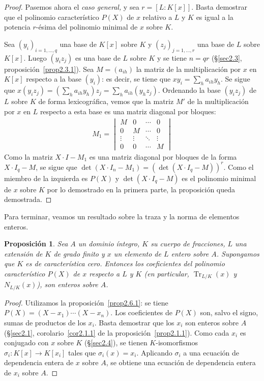 \documentclass[oneside,bibtotoc,leqno,spanish]{amsbook}
\newcommand{\QED}{}%
\renewcommand{\to}[1][]{\xrightarrow{#1}}
\DeclareMathOperator{\Tr}{Tr}
\numberwithin{equation}{section}
\theoremstyle{defi}
\theoremstyle{note}
\newtheorem{proposition}{Proposici\'on}
\theoremstyle{rem}
\numberwithin{theorem}{section}
\numberwithin{proposition}{section}
\numberwithin{definition}{section}
\numberwithin{lemma}{section}
\numberwithin{corollary}{section}
\numberwithin{example}{section}
\numberwithin{footnote}{section}%
\begin{document}
\begin{proof}
Pasemos ahora el {\em caso general,} y sea $r = [L:K[x]]$. Basta demostrar que el polinomio caracter\'istico
$P(X)$ de $x$ relativo a $L$ y $K$ es igual a la potencia $r$-\'esima del polinomio minimal de $x$ sobre $K$.

Sea $(y_{i})_{i=1,\dots,q}$ una base de $K[x]$ sobre $K$ y $(z_{j})_{j=1,\dots,r}$ una base de $L$ sobre $K[x]$.
Luego $(y_{i}z_{j})$ es una base de $L$ sobre $K$ y se tiene $n = qr$ (\S\ref{sec2.3}, proposici\'on~\ref{prop2.3.1}). Sea $M = (a_{ih})$ la
matriz de la multiplicaci\'on por $x$ en $K[x]$ respecto a la base $(y_{i})$: es decir, se tiene que
$xy_{i} = \sum_{h}a_{ih}y_{h}$. Se sigue que $x(y_{i}z_{j}) = \left(\sum_{h}a_{ih}y_{h}\right)z_{j}
= \sum_{h} a_{ih}(y_{h}z_{j})$. Ordenando la base $(y_{i}z_{j})$ de $L$ sobre $K$ de forma lexicogr\'afica,
vemos que la matriz $M'$ de la multiplicaci\'on por $x$ en $L$ respecto a esta base es una matriz
diagonal por bloques:
\begin{gather*}
M_{1} = \begin{vmatrix}
M & 0 & \cdots & 0\\
0 & M & \cdots & 0\\
\vdots & \vdots & \ddots & \vdots\\
0 & 0 & \cdots & M
\end{vmatrix}
\end{gather*}
Como la matriz $X\cdot I-M_{1}$ es una matriz diagonal por bloques de la forma $X\cdot I_{q}-M$, se sigue que
$\det(X\cdot I_{n}-M_{1}) = (\det(X\cdot I_{q}-M))^{r}$. Como el miembro de la izquierda es $P(X)$
y $\det(X\cdot I_{q}-M)$ es el polinomio minimal de $x$ sobre $K$ por lo demostrado en la primera parte,
la proposici\'on queda demostrada. \QED
\end{proof}

Para terminar, veamos un resultado sobre la traza y la norma de elementos enteros.

\begin{proposition}\label{prop2.6.2}
Sea $A$ un dominio \'integro, $K$ su cuerpo de fracciones, $L$ una extensi\'on de $K$ de grado finito
y $x$ un elemento de $L$ entero sobre $A$. Supongamos que $K$ es de caracter\'istica cero. Entonces los
coeficientes del polinomio caracter\'istico $P(X)$ de $x$ respecto a $L$ y $K$ (en particular, $\Tr_{L/K}(x)$
y $N_{L/K}(x)$), son enteros sobre $A$.
\end{proposition}

\begin{proof}
Utilizamos la proposici\'on~\ref{prop2.6.1}: se tiene $P(X) = (X-x_{1})\cdots(X-x_{n})$. Los coeficientes de $P(X)$ son, salvo
el signo, sumas de productos de los $x_{i}$. Basta demostrar que los $x_{i}$ son enteros sobre $A$
(\S\ref{sec2.1}, corolario~\ref{cor2.1.1} de la proposici\'on~\ref{prop2.1.1}).
Como cada $x_{i}$ es conjugado con $x$ sobre $K$ (\S\ref{sec2.4}), se tienen
$K$-isomorfismos $\sigma_{i}:K[x]\to K[x_{i}]$ tales que $\sigma_{i}(x) = x_{i}$. Aplicando $\sigma_{i}$
a una ecuaci\'on de dependencia entera de $x$ sobre $A$, se obtiene una ecuaci\'on de dependencia
entera de $x_{i}$ sobre $A$.
\end{proof}
\end{document}
